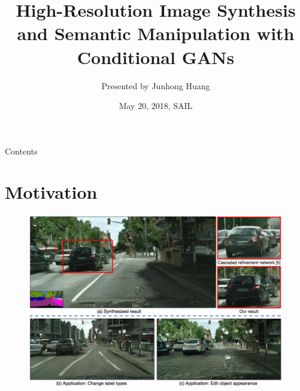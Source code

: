 \documentclass{beamer}
\begin{document}
  
	
	
	
	\title[WGAN]{High-Resolution Image Synthesis and Semantic Manipulation with Conditional GANs}
	\author{Presented by Junhong Huang}
	\date{May 20, 2018, SAIL}
	
	\begin{frame}
	\maketitle
\end{frame}

\begin{frame}{Contents}
\tableofcontents
\end{frame}




\section{Motivation}
\begin{frame}
\begin{figure}
	\centering
	\includegraphics[height=0.45\textheight]{images/conclusion}
\end{figure}
\end{frame}
\end{document}
